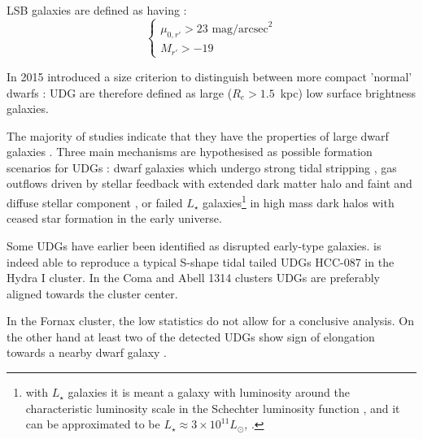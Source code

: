 LSB galaxies are defined as having \citep{Venhola2017}:
\begin{equation}
\begin{cases}
 \mu_{0,r'} > 23 \mbox{ mag/arcsec}^2\\
 M_{r'} > -19
\end{cases}
\end{equation}

In 2015 \citet{VanDokkum2015} introduced a size criterion to distinguish between more compact 'normal' dwarfs \citep{Sales2021}:
UDG are therefore defined as large ($R_e > 1.5$~kpc) low surface brightness galaxies.

The majority of studies indicate that they have the properties of large dwarf galaxies \citep{Sandage1984, Roman2017, Venhola2017, Saifollahi2021}.
Three main mechanisms are hypothesised as possible formation scenarios for UDGs \citep{Rong2020}:
dwarf galaxies which undergo strong tidal stripping \citep{Venhola2017, Carleton2018, Rong2020a},
gas outflows driven by stellar feedback with extended dark matter halo and faint and diffuse stellar component \citep{DiCintio2017, ManceraPina2019},
or failed $L_\star$ galaxies\footnote{with $L_\star$ galaxies it is meant a galaxy with luminosity around the characteristic luminosity scale in the Schechter luminosity function \citep{Press1974}, and it can be approximated to be $L_\star \approx 3\times10^{11}L_\odot$, \cf{}  \citet{Cooray2005}.} in high mass dark halos with ceased star formation in the early universe.

Some UDGs have earlier been identified as disrupted early-type galaxies.
\citet{Koch2012} is indeed able to reproduce a typical S-shape tidal tailed UDGs HCC-087 in the Hydra I cluster. 
In the Coma and Abell 1314 clusters \citep{Yagi2016, ManceraPina2019} UDGs are preferably aligned towards the cluster center.

In the Fornax cluster, the low statistics do not allow for a conclusive analysis.
On the other hand at least two of the detected UDGs show sign of elongation towards a nearby dwarf galaxy \citep[with $M_{r'} > -19$~mag, see][]{Venhola2017}.

